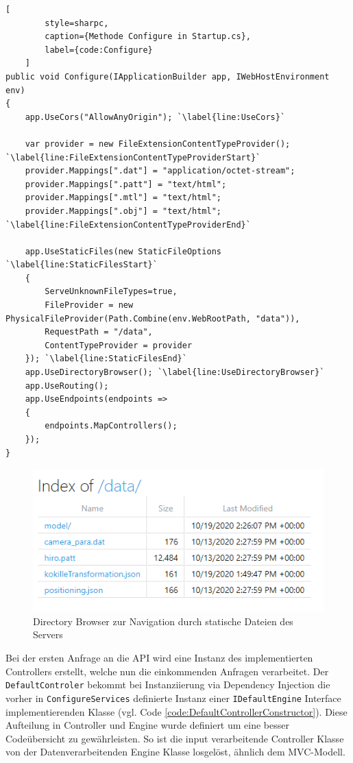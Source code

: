 \begin{codeblock}
	\begin{lstlisting}[
		style=sharpc,
		caption={Methode Configure in Startup.cs},
		label={code:Configure}
	]
public void Configure(IApplicationBuilder app, IWebHostEnvironment env)
{
	app.UseCors("AllowAnyOrigin"); `\label{line:UseCors}`

	var provider = new FileExtensionContentTypeProvider(); `\label{line:FileExtensionContentTypeProviderStart}`
	provider.Mappings[".dat"] = "application/octet-stream";
	provider.Mappings[".patt"] = "text/html";
	provider.Mappings[".mtl"] = "text/html";
	provider.Mappings[".obj"] = "text/html"; `\label{line:FileExtensionContentTypeProviderEnd}`

	app.UseStaticFiles(new StaticFileOptions `\label{line:StaticFilesStart}`
	{
		ServeUnknownFileTypes=true,
		FileProvider = new PhysicalFileProvider(Path.Combine(env.WebRootPath, "data")),
		RequestPath = "/data",
		ContentTypeProvider = provider
	}); `\label{line:StaticFilesEnd}`
	app.UseDirectoryBrowser(); `\label{line:UseDirectoryBrowser}`
	app.UseRouting();
	app.UseEndpoints(endpoints =>
	{
		endpoints.MapControllers();
	});
}
	\end{lstlisting}
\end{codeblock}

\begin{figure}
	\centering
	\includegraphics[width=0.7\linewidth]{images/backend/DirectoryBrowser}
	\caption{Directory Browser zur Navigation durch statische Dateien des Servers}
	\label{fig:DirectoryBrowser}
\end{figure}

Bei der ersten Anfrage an die API wird eine Instanz des implementierten
Controllers erstellt, welche nun die einkommenden Anfragen verarbeitet.
Der \texttt{DefaultControler} bekommt bei Instanziierung via Dependency Injection
die vorher in \texttt{ConfigureServices} definierte Instanz einer \texttt{IDefaultEngine}
Interface implementierenden Klasse
(vgl. Code \ref{code:DefaultControllerConstructor}).
Diese Aufteilung in Controller und Engine wurde definiert um eine besser
Codeübersicht zu gewährleisten. So ist die input verarbeitende Controller
Klasse von der Datenverarbeitenden Engine Klasse losgelöst, ähnlich dem MVC-Modell.

